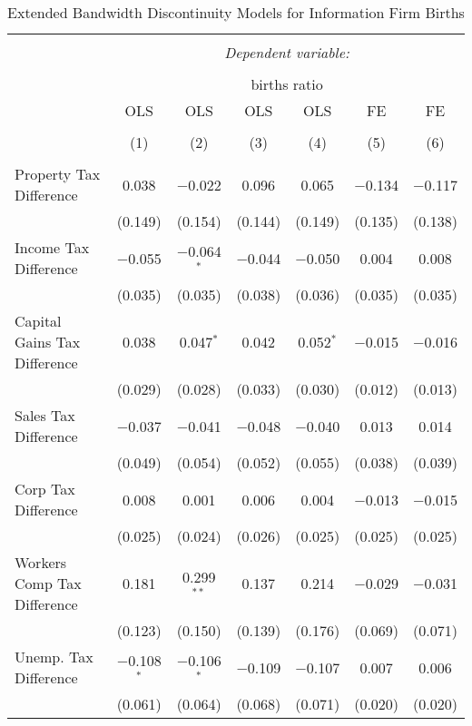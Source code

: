 
\begin{table}[!htbp] \centering 
  \caption{Extended Bandwidth Discontinuity Models for  Information Firm Births} 
  \label{51eb} 
\begin{tabular}{@{\extracolsep{5pt}}lcccccc} 
\\[-1.8ex]\hline 
\hline \\[-1.8ex] 
 & \multicolumn{6}{c}{\textit{Dependent variable:}} \\ 
\cline{2-7} 
\\[-1.8ex] & \multicolumn{6}{c}{births ratio} \\ 
 & OLS & OLS & OLS & OLS & FE & FE \\ 
\\[-1.8ex] & (1) & (2) & (3) & (4) & (5) & (6)\\ 
\hline \\[-1.8ex] 
 Property Tax Difference & 0.038 & $-$0.022 & 0.096 & 0.065 & $-$0.134 & $-$0.117 \\ 
  & (0.149) & (0.154) & (0.144) & (0.149) & (0.135) & (0.138) \\ 
  Income Tax Difference & $-$0.055 & $-$0.064$^{*}$ & $-$0.044 & $-$0.050 & 0.004 & 0.008 \\ 
  & (0.035) & (0.035) & (0.038) & (0.036) & (0.035) & (0.035) \\ 
  Capital Gains Tax Difference & 0.038 & 0.047$^{*}$ & 0.042 & 0.052$^{*}$ & $-$0.015 & $-$0.016 \\ 
  & (0.029) & (0.028) & (0.033) & (0.030) & (0.012) & (0.013) \\ 
  Sales Tax Difference & $-$0.037 & $-$0.041 & $-$0.048 & $-$0.040 & 0.013 & 0.014 \\ 
  & (0.049) & (0.054) & (0.052) & (0.055) & (0.038) & (0.039) \\ 
  Corp Tax Difference & 0.008 & 0.001 & 0.006 & 0.004 & $-$0.013 & $-$0.015 \\ 
  & (0.025) & (0.024) & (0.026) & (0.025) & (0.025) & (0.025) \\ 
  Workers Comp Tax Difference & 0.181 & 0.299$^{**}$ & 0.137 & 0.214 & $-$0.029 & $-$0.031 \\ 
  & (0.123) & (0.150) & (0.139) & (0.176) & (0.069) & (0.071) \\ 
  Unemp. Tax Difference & $-$0.108$^{*}$ & $-$0.106$^{*}$ & $-$0.109 & $-$0.107 & 0.007 & 0.006 \\ 
  & (0.061) & (0.064) & (0.068) & (0.071) & (0.020) & (0.020) \\ 

\end{tabular}
\end{table}
